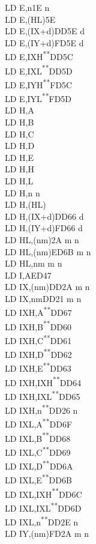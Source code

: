 \documentclass[12pt,twoside,openright,a4paper]{book}
\newcommand{\UNDOC}{\textnormal{\textsuperscript{**}}}
\begin{document}
\begin{multicols}{3}
{\begin{tabbing}
		LD E,n\>1E n\\
		LD E,(HL)\>5E\\
		LD E,(IX+d)\>DD5E d\\
		LD E,(IY+d)\>FD5E d\\
		LD E,IXH\UNDOC\>DD5C\\
		LD E,IXL\UNDOC\>DD5D\\
		LD E,IYH\UNDOC\>FD5C\\
		LD E,IYL\UNDOC\>FD5D\\
		LD H,A\\
		LD H,B\\
		LD H,C\\
		LD H,D\\
		LD H,E\\
		LD H,H\\
		LD H,L\\
		LD H,n n\\
		LD H,(HL)\\
		LD H,(IX+d)\>DD66 d\\
		LD H,(IY+d)\>FD66 d\\
		LD HL,(nm)\>2A m n\\
		LD HL,(nm)\>ED6B m n\\
		LD HL,nm m n\\
		LD I,A\>ED47\\
		LD IX,(nm)\>DD2A m n\\
		LD IX,nm\>DD21 m n\\
		LD IXH,A\UNDOC\>DD67\\
		LD IXH,B\UNDOC\>DD60\\
		LD IXH,C\UNDOC\>DD61\\
		LD IXH,D\UNDOC\>DD62\\
		LD IXH,E\UNDOC\>DD63\\
		LD IXH,IXH\UNDOC\>DD64\\
		LD IXH,IXL\UNDOC\>DD65\\
		LD IXH,n\UNDOC\>DD26 n \\
		LD IXL,A\UNDOC\>DD6F\\
		LD IXL,B\UNDOC\>DD68\\
		LD IXL,C\UNDOC\>DD69\\
		LD IXL,D\UNDOC\>DD6A\\
		LD IXL,E\UNDOC\>DD6B\\
		LD IXL,IXH\UNDOC\>DD6C\\
		LD IXL,IXL\UNDOC\>DD6D\\
		LD IXL,n\UNDOC\>DD2E n\\
		LD IY,(nm)\>FD2A m n\\

\end{tabbing}}
\end{multicols}
\end{document}
